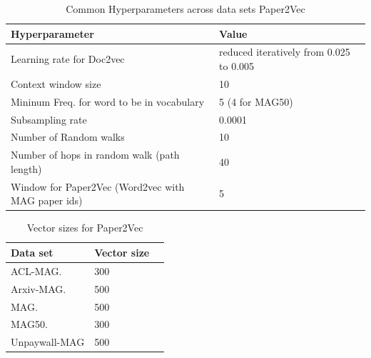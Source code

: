 \begin{table}
\centering
\caption{Common Hyperparameters across data sets Paper2Vec}
\label{tab:paper2vechyperparams}
\begin{footnotesize}
\begin{tabular}{ll@{}c}
\toprule
Hyperparameter & Value \\
\midrule
Learning rate for Doc2vec & reduced iteratively from 0.025 to 0.005 \\
Context window size & 10 \\
Mininum Freq. for word to be in vocabulary & 5 (4 for MAG50) \\
Subsampling rate &  0.0001 \\
Number of Random walks & 10 \\
Number of hops in random walk (path length) & 40 \\
Window for Paper2Vec (Word2vec with MAG paper ids) & 5\\
\bottomrule
\end{tabular}
\end{footnotesize}
\end{table}
\begin{table}
\centering
\caption{Vector sizes for Paper2Vec}
\label{tab:paper2vecvectorsize}
\begin{footnotesize}
\begin{tabular}{ll@{}c}
\toprule
Data set & Vector size \\ %
\midrule
ACL-MAG. & 300 \\
Arxiv-MAG. & 500  \\
MAG. & 500 \\
MAG50. & 300 \\
Unpaywall-MAG & 500 \\
\bottomrule
\end{tabular}
\end{footnotesize}
\end{table}
